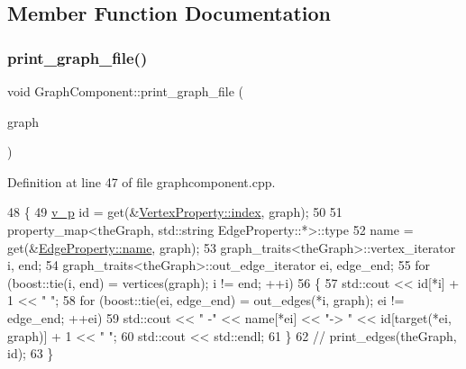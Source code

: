 \subsection{Member Function Documentation}
\mbox{\label{class_graph_component_a6af293dac3774fde0e2822b5725ecacd}} 
\subsubsection{\texorpdfstring{print\+\_\+graph\+\_\+file()}{print\_graph\_file()}}
{\footnotesize\ttfamily void Graph\+Component\+::print\+\_\+graph\+\_\+file (\begin{DoxyParamCaption}\item[{\hyperlink{class_graph_component_a982e0748a6e1b8dc74986f5f8b3dca5c}{the\+Graph} \&}]{graph }\end{DoxyParamCaption})}



Definition at line 47 of file graphcomponent.\+cpp.


\begin{DoxyCode}
48 \{
49     \hyperlink{utilities_8h_a3f4959b3d837fa6351a9414c79280286}{v\_p} \textcolor{keywordtype}{id} = \textcolor{keyword}{get}(&\hyperlink{struct_utility_structs_1_1_vertex_property_a636cb729438e999aa3d9a17ac39d8641}{VertexProperty::index}, graph);
50 
51     property\_map<theGraph, std::string EdgeProperty::*>::type
52         name = \textcolor{keyword}{get}(&\hyperlink{struct_utility_structs_1_1_edge_property_a0701d898f719b1efbf795d80f503de81}{EdgeProperty::name}, graph);
53     graph\_traits<theGraph>::vertex\_iterator i, end;
54     graph\_traits<theGraph>::out\_edge\_iterator ei, edge\_end;
55     \textcolor{keywordflow}{for} (boost::tie(i, end) = vertices(graph); i != end; ++i)
56     \{
57         std::cout << \textcolor{keywordtype}{id}[*i] + 1 << \textcolor{stringliteral}{" "};
58         \textcolor{keywordflow}{for} (boost::tie(ei, edge\_end) = out\_edges(*i, graph); ei != edge\_end; ++ei)
59             std::cout << \textcolor{stringliteral}{" -"} << name[*ei] << \textcolor{stringliteral}{"-> "} << \textcolor{keywordtype}{id}[target(*ei, graph)] + 1 << \textcolor{stringliteral}{"  "};
60         std::cout << std::endl;
61     \}
62     \textcolor{comment}{// print\_edges(theGraph, id);}
63 \}
\end{DoxyCode}
\mbox{\label{class_graph_component_a680363eab8b992d739f055bd484bc000}} 
